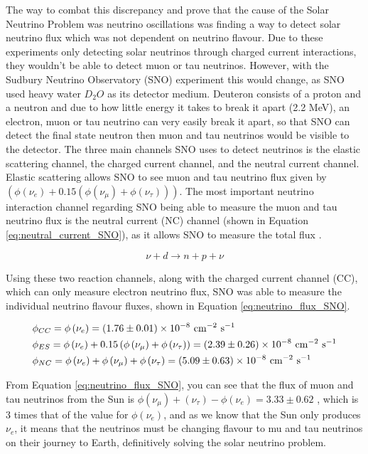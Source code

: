 The way to combat this discrepancy and prove that the cause of the Solar Neutrino Problem was neutrino oscillations was finding a way to detect solar neutrino flux which was not dependent on neutrino flavour. Due to these experiments only detecting solar neutrinos through charged current interactions, they wouldn't be able to detect muon or tau neutrinos. However, with the Sudbury Neutrino Observatory (SNO) experiment this would change, as SNO used heavy water $D_{2}O$ as its detector medium. Deuteron consists of a proton and a neutron and due to how little energy it takes to break it apart (2.2 MeV), an electron, muon or tau neutrino can very easily break it apart, so that SNO can detect the final state neutron then muon and tau neutrinos would be visible to the detector. The three main channels SNO uses to detect neutrinos is the elastic scattering channel, the charged current channel, and the neutral current channel. Elastic scattering allows SNO to see muon and tau neutrino flux given by $(\phi(\nu_{e}) + 0.15(\phi(\nu_{\mu}) + \phi(\nu_{\tau})))$. The most important neutrino interaction channel regarding SNO being able to measure the muon and tau neutrino flux is the neutral current (NC) channel (shown in Equation \ref{eq:neutral_current_SNO}), as it allows SNO to measure the total flux \cite{krastev2002global}.

\begin{equation}
    \nu + d \rightarrow n + p + \nu
\label{eq:neutral_current_SNO}
\end{equation}

Using these two reaction channels, along with the charged current channel (CC), which can only measure electron neutrino flux, SNO was able to measure the individual neutrino flavour fluxes, shown in Equation \ref{eq:neutrino_flux_SNO}. 


\begin{align}
&\phi_{C C}=\phi\left(\nu_{e}\right)= (1.76 \pm 0.01) \times 10^{-8} \mathrm{~cm}^{-2} \mathrm{~s}^{-1} \label{eq:neutrino_flux_SNO}\\
&\phi_{E S}=\phi\left(\nu_{e}\right)+0.15\left(\phi\left(\nu_{\mu}\right)+\phi\left(\nu_{\tau}\right)\right)= (2.39 \pm 0.26) \times 10^{-8} \mathrm{~cm}^{-2} \mathrm{~s}^{-1} \notag\\
&\phi_{N C}=\phi\left(\nu_{e}\right)+\phi\left(\nu_{\mu}\right)+\phi\left(\nu_{\tau}\right) = (5.09 \pm 0.63) \times 10^{-8} \mathrm{~cm}^{-2} \mathrm{~s}^{-1} \notag
\end{align}


From Equation \ref{eq:neutrino_flux_SNO}, you can see that the flux of muon and tau neutrinos from the Sun is $\phi(\nu_{\mu}) + (\nu_{\tau}) - \phi(\nu_{e}) = 3.33 \pm 0.62$ , which is 3 times that of the value for $\phi(\nu_{e})$, and as we know that the Sun only produces $\nu_{e}$, it means that the neutrinos must be changing flavour to mu and tau neutrinos on their journey to Earth, definitively solving the solar neutrino problem. 


